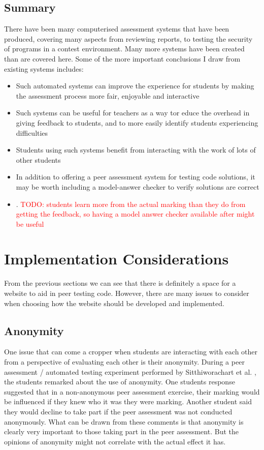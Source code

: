 \documentclass[a4paper,11pt]{report}
\newcommand{\todo}[1]{\textcolor{red}{TODO: #1}}
\begin{document}
\subsection{Summary}
There have been many computerised assessment systems that have been produced, covering many aspects from reviewing reports, to testing the security of programs in a contest environment. Many more systems have been created than are covered here. Some of the more important conclusions I draw from existing systems includes:
\begin{itemize}
 \item Such automated systems can improve the experience for students by making the assessment process more fair, enjoyable and interactive
 \item Such systems can be useful for teachers as a way tor educe the overhead in giving feedback to students, and to more easily identify students experiencing difficulties
 \item Students using such systems benefit from interacting with the work of lots of other students
 \item In addition to offering a peer assessment system for testing code solutions, it may be worth including a model-answer checker to verify solutions are correct
 \item . \todo{students learn more from the actual marking than they do from getting the feedback, so having a model answer checker available after might be useful}
\end{itemize}


\section{Implementation Considerations}
From the previous sections we can see that there is definitely a space for a website to aid in peer testing code. However, there are many issues to consider when choosing how the website should be developed and implemented.

\subsection{Anonymity}
One issue that can come a cropper when students are interacting with each other from a perspective of evaluating each other is their anonymity. During a peer assessment / automated testing experiment performed by Sitthiworachart et al. \cite{sitthiworachart_effective_2004}, the students remarked about the use of anonymity. One students response suggested that in a non-anonymous peer assessment exercise, their marking would be influenced if they knew who it was they were marking. Another student said they would decline to take part if the peer assessment was not conducted anonymously. What can be drawn from these comments is that anonymity is clearly very important to those taking part in the peer assessment. But the opinions of anonymity might not correlate with the actual effect it has.\par
\end{document}
